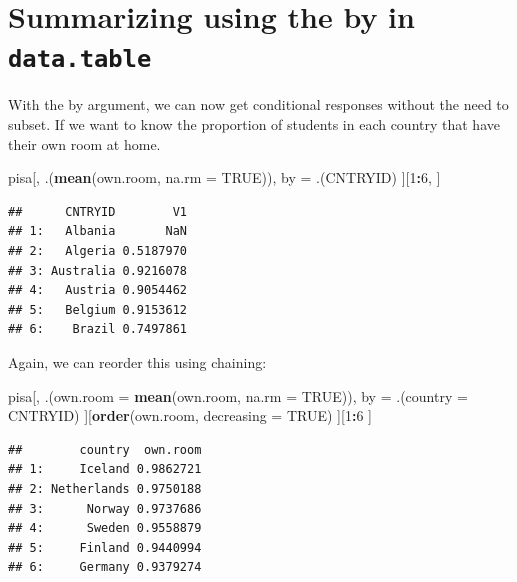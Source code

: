 \documentclass[]{book}
\newenvironment{Shaded}{\begin{snugshade}}{\end{snugshade}}
\newcommand{\DataTypeTok}[1]{\textcolor[rgb]{0.13,0.29,0.53}{#1}}
\newcommand{\DecValTok}[1]{\textcolor[rgb]{0.00,0.00,0.81}{#1}}
\newcommand{\KeywordTok}[1]{\textcolor[rgb]{0.13,0.29,0.53}{\textbf{#1}}}
\newcommand{\NormalTok}[1]{#1}
\newcommand{\OperatorTok}[1]{\textcolor[rgb]{0.81,0.36,0.00}{\textbf{#1}}}
\newcommand{\OtherTok}[1]{\textcolor[rgb]{0.56,0.35,0.01}{#1}}
\newcommand{\StringTok}[1]{\textcolor[rgb]{0.31,0.60,0.02}{#1}}
\begin{document}
\hypertarget{summarizing-using-the-by-in-data.table}{%
\section{\texorpdfstring{Summarizing using the by in \texttt{data.table}}{Summarizing using the by in data.table}}\label{summarizing-using-the-by-in-data.table}}

With the by argument, we can now get conditional responses without the need to subset. If we want to know the proportion of students in each country that have their own room at home.

\begin{Shaded}
\begin{Highlighting}[]
\NormalTok{pisa[,}
\NormalTok{     .(}\KeywordTok{mean}\NormalTok{(own.room, }\DataTypeTok{na.rm =} \OtherTok{TRUE}\NormalTok{)),}
\NormalTok{     by =}\StringTok{ }\NormalTok{.(CNTRYID)}
\NormalTok{     ][}\DecValTok{1}\OperatorTok{:}\DecValTok{6}\NormalTok{,}
\NormalTok{     ]}
\end{Highlighting}
\end{Shaded}

\begin{verbatim}
##      CNTRYID        V1
## 1:   Albania       NaN
## 2:   Algeria 0.5187970
## 3: Australia 0.9216078
## 4:   Austria 0.9054462
## 5:   Belgium 0.9153612
## 6:    Brazil 0.7497861
\end{verbatim}

Again, we can reorder this using chaining:

\begin{Shaded}
\begin{Highlighting}[]
\NormalTok{pisa[,}
\NormalTok{     .(}\DataTypeTok{own.room =} \KeywordTok{mean}\NormalTok{(own.room, }\DataTypeTok{na.rm =} \OtherTok{TRUE}\NormalTok{)),}
\NormalTok{     by =}\StringTok{ }\NormalTok{.(}\DataTypeTok{country =}\NormalTok{ CNTRYID)}
\NormalTok{     ][}\KeywordTok{order}\NormalTok{(own.room, }\DataTypeTok{decreasing =} \OtherTok{TRUE}\NormalTok{)}
\NormalTok{       ][}\DecValTok{1}\OperatorTok{:}\DecValTok{6}
\NormalTok{         ]}
\end{Highlighting}
\end{Shaded}

\begin{verbatim}
##        country  own.room
## 1:     Iceland 0.9862721
## 2: Netherlands 0.9750188
## 3:      Norway 0.9737686
## 4:      Sweden 0.9558879
## 5:     Finland 0.9440994
## 6:     Germany 0.9379274
\end{verbatim}
\end{document}
